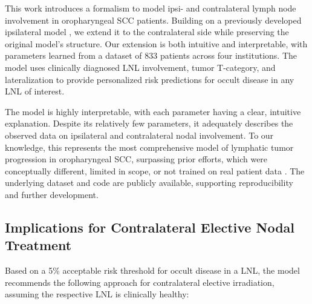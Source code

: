 \documentclass[
  sn-mathphys-num,
]{sn-jnl}
\begin{document}
This work introduces a formalism to model ipsi- and contralateral lymph
node involvement in oropharyngeal SCC patients. Building on a previously
developed ipsilateral model
\citep{ludwig_hidden_2021, ludwig_modelling_2023}, we extend it to the
contralateral side while preserving the original model's structure. Our
extension is both intuitive and interpretable, with parameters learned
from a dataset of 833 patients across four institutions. The model uses
clinically diagnosed LNL involvement, tumor T-category, and
lateralization to provide personalized risk predictions for occult
disease in any LNL of interest.

The model is highly interpretable, with each parameter having a clear,
intuitive explanation. Despite its relatively few parameters, it
adequately describes the observed data on ipsilateral and contralateral
nodal involvement. To our knowledge, this represents the most
comprehensive model of lymphatic tumor progression in oropharyngeal SCC,
surpassing prior efforts, which were conceptually different, limited in
scope, or not trained on real patient data
\citep{benson_markov_2006, jung_development_2017}. The underlying
dataset and code are publicly available, supporting reproducibility and
further development.

\subsection{Implications for Contralateral Elective Nodal
Treatment}\label{implications-for-contralateral-elective-nodal-treatment}

Based on a 5\% acceptable risk threshold for occult disease in a LNL,
the model recommends the following approach for contralateral elective
irradiation, assuming the respective LNL is clinically healthy:
\end{document}
